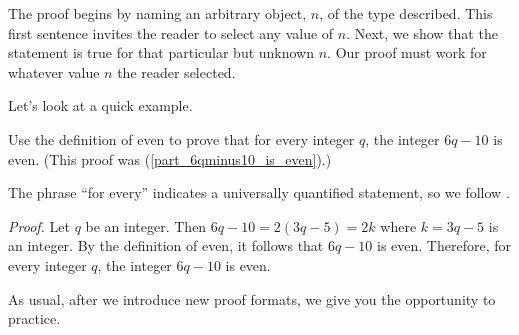 The proof begins by naming an arbitrary object, $n$, of the type described. This first sentence invites the reader to select any value of $n$.  Next, we show that the statement is true for that particular but unknown $n$. Our proof must work for whatever value $n$ the reader selected.

Let's look at a quick example.

\begin{exam}[$6q-10$ is even]
\label{exam_6qminus10_is_even}
    Use the definition of even to prove that for every integer $q$, the integer $6q-10$ is even.  (This proof was   (\ref{part_6qminus10_is_even}).)
        \begin{soln}
            The phrase ``for every'' indicates a universally quantified statement, so we follow .
        
                \emph{Proof.} 
                    Let $q$ be an integer. Then $6q-10=2(3q-5)=2k$ where $k=3q-5$ is an integer.  By the definition of even, it follows that $6q-10$ is even. Therefore, for every integer $q$, the integer $6q-10$ is even.  
        \end{soln}
\end{exam}

As usual, after we introduce new proof formats, we give you the opportunity to practice.

